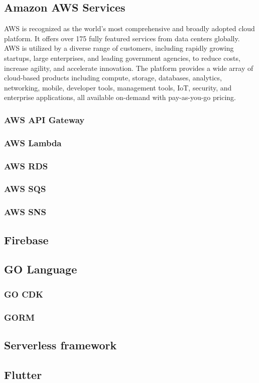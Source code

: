 \subsection{Amazon AWS Services}
AWS is recognized as the world's most comprehensive and broadly adopted cloud platform. It offers
over 175 fully featured services from data centers globally. AWS is utilized by a diverse range of
customers, including rapidly growing startups, large enterprises, and leading government agencies,
to reduce costs, increase agility, and accelerate innovation. The platform provides a wide array of
cloud-based products including compute, storage, databases, analytics, networking, mobile, developer
tools, management tools, IoT, security, and enterprise applications, all available on-demand with
pay-as-you-go pricing.
\subsubsection{AWS API Gateway}
\subsubsection{AWS Lambda}
\subsubsection{AWS RDS}
\subsubsection{AWS SQS}
\subsubsection{AWS SNS}
\subsection{Firebase}
\subsection{GO Language}
\subsubsection{GO CDK}
\subsubsection{GORM}
\subsection{Serverless framework}
\subsection{Flutter}
